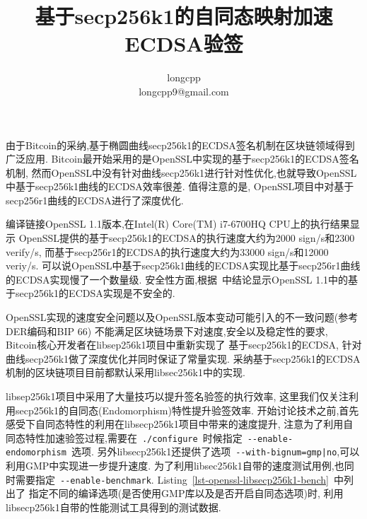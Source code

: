 \documentclass{article}
\newcommand{\code}[1]{\lstinline!#1!}
\begin{document}
\title{基于secp256k1的自同态映射加速ECDSA验签}
\author{longcpp \\ \small{longcpp9@gmail.com}}

\maketitle

由于Bitcoin的采纳,基于椭圆曲线secp256k1的ECDSA签名机制在区块链领域得到广泛应用.
Bitcoin最开始采用的是OpenSSL中实现的基于secp256k1的ECDSA签名机制,
然而OpenSSL中没有针对曲线secp256k1进行针对性优化,也就导致OpenSSL中基于secp256k1曲线的ECDSA效率很差.
值得注意的是, OpenSSL项目中对基于secp256r1曲线的ECDSA进行了深度优化.
 
% 


编译链接OpenSSL 1.1版本,在Intel(R) Core(TM) i7-6700HQ CPU上的执行结果显示
OpenSSL提供的基于secp256k1的ECDSA的执行速度大约为2000  sign/s和2300 verify/s,
而基于secp256r1的ECDSA的执行速度大约为33000 sign/s和12000 veriy/s.
可以说OpenSSL中基于secp256k1曲线的ECDSA实现比基于secp256r1曲线的ECDSA实现慢了一个数量级.
安全性方面,根据~\cite{ecdsa-side-channel}中结论显示OpenSSL 1.1中的基于secp256k1的ECDSA实现是不安全的.

OpenSSL实现的速度安全问题以及OpenSSL版本变动可能引入的不一致问题(参考DER编码和BIP 66)
不能满足区块链场景下对速度,安全以及稳定性的要求, Bitcoin核心开发者在libsep256k1项目中重新实现了
基于secp256k1的ECDSA, 针对曲线secp256k1做了深度优化并同时保证了常量实现.
采纳基于secp256k1的ECDSA机制的区块链项目目前都默认采用libsec256k1中的实现.

libsep256k1项目中采用了大量技巧以提升签名验签的执行效率,
这里我们仅关注利用secp256k1的自同态(Endomorphism)特性提升验签效率.
开始讨论技术之前,首先感受下自同态特性的利用在libsecp256k1项目中带来的速度提升,
注意为了利用自同态特性加速验签过程,需要在~\code{./configure}~时候指定~\code{--enable-endomorphism}~选项.
另外libsecp256k1还提供了选项~\code{--with-bignum=gmp|no},可以利用GMP中实现进一步提升速度.
为了利用libsec256k1自带的速度测试用例,也同时需要指定~\code{--enable-benchmark}.
Listing~\ref{lst-openssl-libsecp256k1-bench}~中列出了
指定不同的编译选项(是否使用GMP库以及是否开启自同态选项)时,
利用libsecp256k1自带的性能测试工具得到的测试数据.
\end{document}
